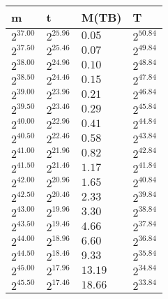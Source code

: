\begin{tabular}{llll}
m & t & M(TB) & T \\ \hline
$2^{37.00}$ & $2^{25.96}$ & $0.05$ & $2^{50.84}$ \\
$2^{37.50}$ & $2^{25.46}$ & $0.07$ & $2^{49.84}$ \\
$2^{38.00}$ & $2^{24.96}$ & $0.10$ & $2^{48.84}$ \\
$2^{38.50}$ & $2^{24.46}$ & $0.15$ & $2^{47.84}$ \\
$2^{39.00}$ & $2^{23.96}$ & $0.21$ & $2^{46.84}$ \\
$2^{39.50}$ & $2^{23.46}$ & $0.29$ & $2^{45.84}$ \\
$2^{40.00}$ & $2^{22.96}$ & $0.41$ & $2^{44.84}$ \\
$2^{40.50}$ & $2^{22.46}$ & $0.58$ & $2^{43.84}$ \\
$2^{41.00}$ & $2^{21.96}$ & $0.82$ & $2^{42.84}$ \\
$2^{41.50}$ & $2^{21.46}$ & $1.17$ & $2^{41.84}$ \\
$2^{42.00}$ & $2^{20.96}$ & $1.65$ & $2^{40.84}$ \\
$2^{42.50}$ & $2^{20.46}$ & $2.33$ & $2^{39.84}$ \\
$2^{43.00}$ & $2^{19.96}$ & $3.30$ & $2^{38.84}$ \\
$2^{43.50}$ & $2^{19.46}$ & $4.66$ & $2^{37.84}$ \\
$2^{44.00}$ & $2^{18.96}$ & $6.60$ & $2^{36.84}$ \\
$2^{44.50}$ & $2^{18.46}$ & $9.33$ & $2^{35.84}$ \\
$2^{45.00}$ & $2^{17.96}$ & $13.19$ & $2^{34.84}$ \\
$2^{45.50}$ & $2^{17.46}$ & $18.66$ & $2^{33.84}$ \\
\end{tabular}
\\\\
\\\\
